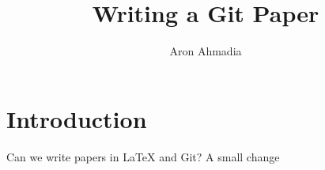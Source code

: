 \documentclass[12pt]{article}
\author{Aron Ahmadia} \title{Writing a Git Paper}
\begin{document}
\maketitle

\section{Introduction}

Can we write papers in LaTeX and Git?
A small change
\end{document}
